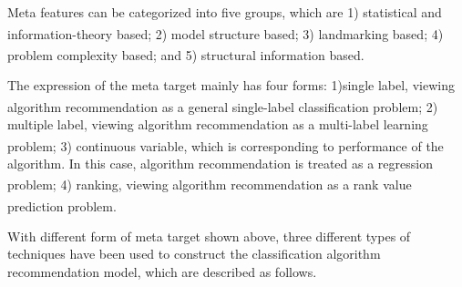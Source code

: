 \documentclass[review,3p,twocolumn,times]{elsarticle}
\newcommand{\upcite}[1]{\textsuperscript{\cite{#1}}}
\begin{document}
Meta features can be categorized into five groups, which are 1) statistical and information-theory based\upcite{Brazdil2003Ranking,Kalousis1999NOEMON,Sohn1999Meta,Gore2013Dynamic,Ali2018A}; 2) model structure based\upcite{Bensusan1998God,Peng2002Improved}; 3) landmarking based\upcite{Pfahringer2000Meta,Bensusan2000Casa,Reif2014Automatic,Balte2015Algorithm}; 4) problem complexity based\upcite{Ho2000Complexity, Ho2002Complexity, Elizondo2009Estimation}; and 5) structural information based\upcite{song2012automatic,Wang2015An}.

The expression of the meta target mainly has four forms: 1)single label, viewing algorithm recommendation as a general single-label classification problem\upcite{song2012automatic,Gore2013Dynamic}; 2) multiple label, viewing algorithm recommendation as a multi-label learning problem\upcite{Wang2014A,Ali2018A}; 3) continuous variable, which is corresponding to performance of the algorithm. In this case, algorithm recommendation is treated as a regression problem\upcite{Reif2014Automatic,Bensusan2001Estimating,Balte2015Algorithm}; 4) ranking, viewing algorithm recommendation as a rank value prediction problem\upcite{Brazdil2003Ranking,Kasture2015Dynamic}.

With different form of meta target shown above, three different types of techniques have been used to construct the classification algorithm recommendation model, which are described as follows.
\end{document}
